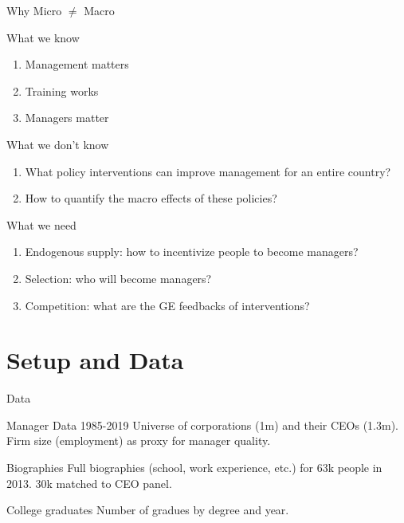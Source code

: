 \documentclass[
  ignorenonframetext,
  aspectratio=1610,
]{beamer}
\providecommand{\tightlist}{%
  \setlength{\itemsep}{0pt}\setlength{\parskip}{0pt}}
\let\oldsection\section
\renewcommand{\section}{
  \addtocounter{framenumber}{-1} %
  \oldsection
}
\begin{document}
\begin{frame}{Why Micro \(\neq\) Macro}
\protect\hypertarget{why-micro-neq-macro}{}
\begin{block}{What we know}
\protect\hypertarget{what-we-know}{}
\begin{enumerate}
\tightlist
\item
  Management matters
\item
  Training works
\item
  Managers matter
\end{enumerate}

\pause
\end{block}

\begin{block}{What we don't know}
\protect\hypertarget{what-we-dont-know}{}
\begin{enumerate}
\tightlist
\item
  What policy interventions can improve management for an entire
  country?
\item
  How to quantify the macro effects of these policies?
\end{enumerate}

\pause
\end{block}

\begin{block}{What we need}
\protect\hypertarget{what-we-need}{}
\begin{enumerate}
\tightlist
\item
  Endogenous supply: how to incentivize people to become managers?
\item
  Selection: who will become managers?
\item
  Competition: what are the GE feedbacks of interventions?
\end{enumerate}
\end{block}
\end{frame}

\section{Setup and Data}\label{setup-and-data}

\begin{frame}{Data}
\protect\hypertarget{data}{}
\begin{block}{Manager Data 1985-2019}
\protect\hypertarget{manager-data-1985-2019}{}
Universe of corporations (1m) and their CEOs (1.3m). Firm size
(employment) as proxy for manager quality.
\end{block}

\begin{block}{Biographies}
\protect\hypertarget{biographies}{}
Full biographies (school, work experience, etc.) for 63k people in 2013.
30k matched to CEO panel.
\end{block}

\begin{block}{College graduates}
\protect\hypertarget{college-graduates}{}
Number of gradues by degree and year.
\end{block}
\end{frame}
\end{document}
